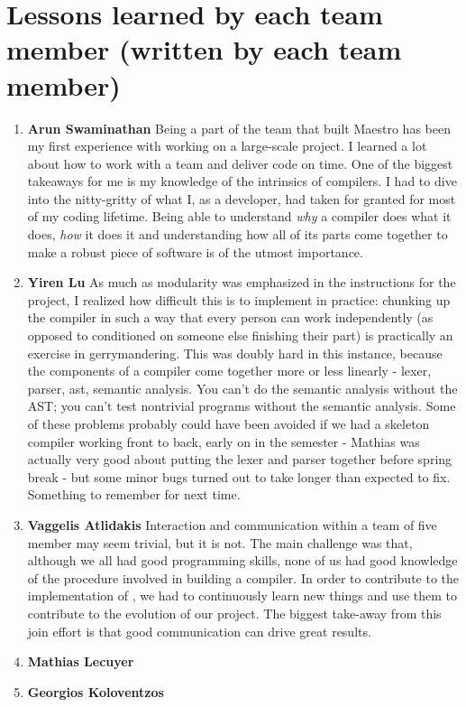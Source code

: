 \section{Lessons learned by each team member (written by each team member)}
\begin{enumerate}
\item \textbf{Arun Swaminathan} \newline
Being a part of the team that built Maestro has been my first experience with working on a large-scale project. I learned a lot about how to work with a team and deliver code on time.
One of the biggest takeaways for me is my knowledge of the intrinsics of compilers. I had to dive into the nitty-gritty of what I, as a developer, had taken for granted for most of my coding lifetime. Being able to understand \textit{why} a compiler does what it does, \textit{how} it does it and understanding how all of its parts come together to make a robust piece of software is of the utmost importance.

\item \textbf{Yiren Lu} \newline
As much as modularity was emphasized in the instructions for the project, I realized how difficult this is to implement in practice: chunking up the compiler in such a way that every person can work independently (as opposed to conditioned on someone else finishing their part) is practically an exercise in gerrymandering. This was doubly hard in this instance, because the components of a compiler come together more or less linearly - lexer, parser, ast, semantic analysis. You can't do the semantic analysis without the AST; you can't test nontrivial programs without the semantic analysis. Some of these problems probably could have been avoided if we had a skeleton compiler working front to back, early on in the semester - Mathias was actually very good about putting the lexer and parser together before spring break - but some minor bugs turned out to take longer than expected to fix. Something to remember for next time.

\item \textbf{Vaggelis Atlidakis} \newline
Interaction and communication within a team of five member may seem trivial,
but it is not. The main challenge was that, although we all had
good programming skills, none of us had good knowledge of the procedure
involved in building a compiler. In order to contribute to the implementation
of \lang{}, we had to continuously learn new things and use them to contribute
to the evolution of our project. The biggest take-away from this join effort is
that good communication can drive great results.


\item \textbf{Mathias Lecuyer}

\item \textbf{Georgios Koloventzos}

\end{enumerate}
